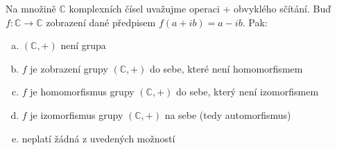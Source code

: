 Na množině $\mathbb{C}$ komplexních čísel uvažujme operaci + obvyklého sčítání.
Buď $f: \mathbb{C} \rightarrow \mathbb{C}$ zobrazení dané předpisem $f(a+ib) = a
- ib$. Pak:
\begin{enumerate}[a)]
  \item $(\mathbb{C},+)$ není grupa
  \item $f$ je zobrazení grupy $(\mathbb{C},+)$ do sebe, které není
    homomorfismem
  \item $f$ je homomorfismus grupy $(\mathbb{C},+)$ do sebe, který není
    izomorfismem
  \item $f$ je izomorfismus grupy $(\mathbb{C},+)$ na sebe (tedy automorfismus)
  \item neplatí žádná z uvedených možností
\end{enumerate}

